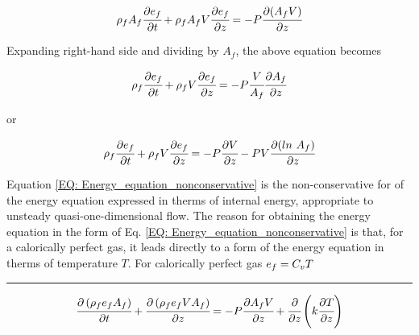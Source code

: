 \documentclass[../Article_Model_Parameters.tex]{subfiles}
\begin{document}
	{\footnotesize
		\begin{equation}
			\rho_f A_f \cfrac{\partial e_f}{\partial t} + \rho_f A_f V \cfrac{\partial e_f}{\partial z} = - P \cfrac{\partial (A_f V) }{\partial z}
		\end{equation}
	}
	
	Expanding right-hand side and dividing by $A_f$, the above equation becomes 
	
	{\footnotesize
		\begin{equation}
			\rho_f \cfrac{\partial e_f}{\partial t} + \rho_f V \cfrac{\partial e_f}{\partial z} = -P \cfrac{V}{A_f} \cfrac{\partial A_f}{\partial z}
		\end{equation}
	}

	or
	
	{\footnotesize
		\begin{equation}
			\rho_f \cfrac{\partial e_f}{\partial t} + \rho_f V \cfrac{\partial e_f}{\partial z} = -P \cfrac{\partial V}{\partial z} - P V \cfrac{\partial (ln~A_f)}{\partial z}
			\label{EQ: Energy_equation_nonconservative}
		\end{equation}
	}
	
	Equation \ref{EQ: Energy_equation_nonconservative} is the non-conservative for of the energy equation expressed in therms of internal energy, appropriate to unsteady quasi-one-dimensional flow. The reason for obtaining the energy equation in the form of Eq. \ref{EQ: Energy_equation_nonconservative} is that, for a calorically perfect gas, it leads directly to a form of the energy equation in therms of temperature $T$. For calorically perfect gas ${\footnotesize e_f=C_vT}$
	
	\hrule
	
	{\footnotesize
		\begin{equation}
			\cfrac{\partial \left( \rho_f e_f A_f \right) }{\partial t} + \cfrac{\partial \left( \rho_f  e_f V A_f \right)}{\partial z} = -P \cfrac{\partial A_f V}{\partial z} + \cfrac{\partial}{\partial z} \left( k \cfrac{\partial T}{\partial z} \right)
		\end{equation}
	}
	
	
	
	
	
	
	
	
	
	
	
	
	
	
	
\end{document}
